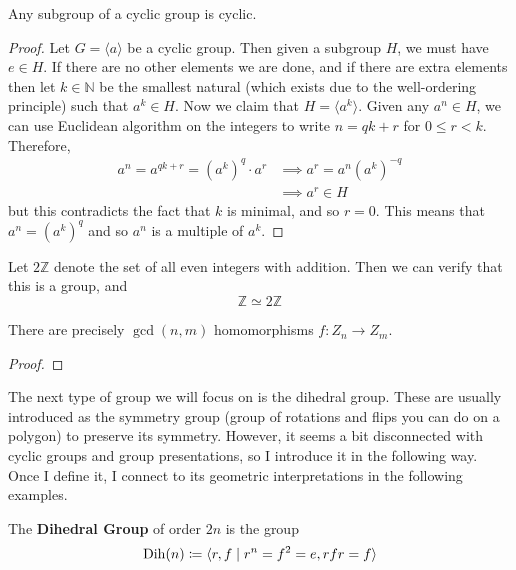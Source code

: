   \begin{theorem}
    Any subgroup of a cyclic group is cyclic. 
  \end{theorem}
  \begin{proof}
    Let $G = \langle a \rangle$ be a cyclic group. Then given a subgroup $H$, we must have $e \in H$. If there are no other elements we are done, and if there are extra elements then let $k \in \mathbb{N}$ be the smallest natural (which exists due to the well-ordering principle) such that $a^k \in H$. Now we claim that $H = \langle a^k \rangle$. Given any $a^n \in H$, we can use Euclidean algorithm on the integers to write $n = qk + r$ for $0 \leq r < k$. Therefore, 
    \begin{align}
      a^n = a^{qk + r} = (a^k)^q \cdot a^r & \implies a^r = a^n (a^k)^{-q} \\
                                           & \implies a^r \in H 
    \end{align}
    but this contradicts the fact that $k$ is minimal, and so $r = 0$. This means that $a^n = (a^k)^q$ and so $a^n$ is a multiple of $a^k$. 
  \end{proof}

  \begin{example}
    Let $2 \mathbb{Z}$ denote the set of all even integers with addition. Then we can verify that this is a group, and 
    \begin{equation}
      \mathbb{Z} \simeq 2 \mathbb{Z}
    \end{equation}
  \end{example}

  \begin{theorem}
    There are precisely $\gcd(n, m)$ homomorphisms $f: Z_n \to Z_m$. 
  \end{theorem}
  \begin{proof}
    
  \end{proof}

  The next type of group we will focus on is the dihedral group. These are usually introduced as the symmetry group (group of rotations and flips you can do on a polygon) to preserve its symmetry. However, it seems a bit disconnected with cyclic groups and group presentations, so I introduce it in the following way. Once I define it, I connect to its geometric interpretations in the following examples. 

  \begin{definition}
    The \textbf{Dihedral Group} of order $2n$ is the group 
    \begin{equation}
      \Dih(n) \coloneqq \langle r, f \mid r^n = f^2 = e, rfr = f  \rangle
    \end{equation}
  \end{definition}

